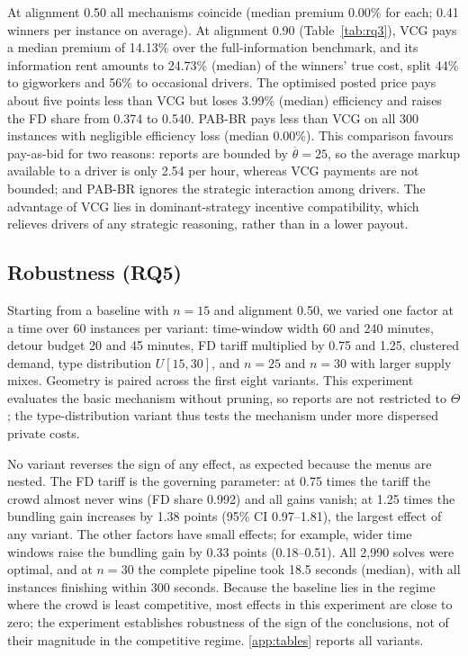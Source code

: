 \documentclass[review,12pt]{elsarticle}
\theoremstyle{definition}
\theoremstyle{remark}
\newcommand{\uth}{\overline{\theta}}
\begin{document}
At alignment 0.50 all mechanisms coincide (median premium 0.00\% for each;
0.41 winners per instance on average). At alignment 0.90
(Table~\ref{tab:rq3}), VCG pays a median premium of 14.13\% over the
full-information benchmark, and its information rent amounts to 24.73\%
(median) of the winners' true cost, split 44\% to gigworkers and 56\% to
occasional drivers. The optimised posted price pays about five points less
than VCG but loses 3.99\% (median) efficiency and raises the FD share from
0.374 to 0.540. PAB-BR pays less than VCG on all 300 instances with
negligible efficiency loss (median 0.00\%). This comparison favours
pay-as-bid for two reasons: reports are bounded by $\uth=25$, so the average
markup available to a driver is only 2.54 per hour, whereas VCG payments are
not bounded; and PAB-BR ignores the strategic interaction among drivers. The
advantage of VCG lies in dominant-strategy incentive compatibility, which
relieves drivers of any strategic reasoning, rather than in a lower payout.

\subsection{Robustness (RQ5)}

Starting from a baseline with $n=15$ and alignment 0.50, we varied one
factor at a time over 60 instances per variant: time-window width 60 and 240
minutes, detour budget 20 and 45 minutes, FD tariff multiplied by 0.75 and
1.25, clustered demand, type distribution $U[15,30]$, and $n=25$ and $n=30$
with larger supply mixes. Geometry is paired across the first eight
variants. This experiment evaluates the basic mechanism without pruning, so
reports are not restricted to $\Theta$; the type-distribution variant thus
tests the mechanism under more dispersed private costs.

No variant reverses the sign of any effect, as expected because the menus
are nested. The FD tariff is the governing parameter: at 0.75 times the
tariff the crowd almost never wins (FD share 0.992) and all gains vanish; at
1.25 times the bundling gain increases by 1.38 points (95\% CI 0.97--1.81),
the largest effect of any variant. The other factors have small effects;
for example, wider time windows raise the bundling gain by 0.33 points
(0.18--0.51). All 2,990 solves were optimal, and at $n=30$ the complete
pipeline took 18.5 seconds (median), with all instances finishing within 300
seconds. Because the baseline lies in the regime where the crowd is least
competitive, most effects in this experiment are close to zero; the
experiment establishes robustness of the sign of the conclusions, not of
their magnitude in the competitive regime. \ref{app:tables} reports all
variants.
\end{document}
